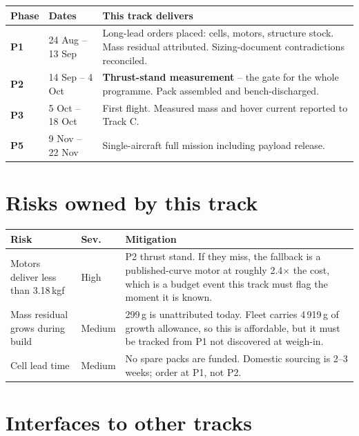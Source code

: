 \documentclass[11pt,a4paper]{article}
\begin{document}
\begin{center}
\begin{tabular}{@{}llp{88mm}@{}}
\toprule
\textbf{Phase} & \textbf{Dates} & \textbf{This track delivers} \\
\midrule
\textbf{P1} & 24 Aug -- 13 Sep & Long-lead orders placed: cells, motors, structure stock. Mass residual attributed. Sizing-document contradictions reconciled. \\
\textbf{P2} & 14 Sep -- 4 Oct & \textbf{Thrust-stand measurement} -- the gate for the whole programme. Pack assembled and bench-discharged. \\
\textbf{P3} & 5 Oct -- 18 Oct & First flight. Measured mass and hover current reported to Track C. \\
\textbf{P5} & 9 Nov -- 22 Nov & Single-aircraft full mission including payload release. \\
\bottomrule
\end{tabular}
\end{center}

\section{Risks owned by this track}

\begin{center}
\begin{tabular}{@{}p{50mm}lp{70mm}@{}}
\toprule
\textbf{Risk} & \textbf{Sev.} & \textbf{Mitigation} \\
\midrule
Motors deliver less than 3.18\,kgf & High & P2 thrust stand. If they miss, the fallback is a published-curve motor at roughly 2.4$\times$ the cost, which is a budget event this track must flag the moment it is known. \\
Mass residual grows during build & Medium & 299\,g is unattributed today. Fleet carries 4\,919\,g of growth allowance, so this is affordable, but it must be tracked from P1 not discovered at weigh-in. \\
Cell lead time & Medium & No spare packs are funded. Domestic sourcing is 2--3 weeks; order at P1, not P2. \\
\bottomrule
\end{tabular}
\end{center}

\section{Interfaces to other tracks}
\end{document}
